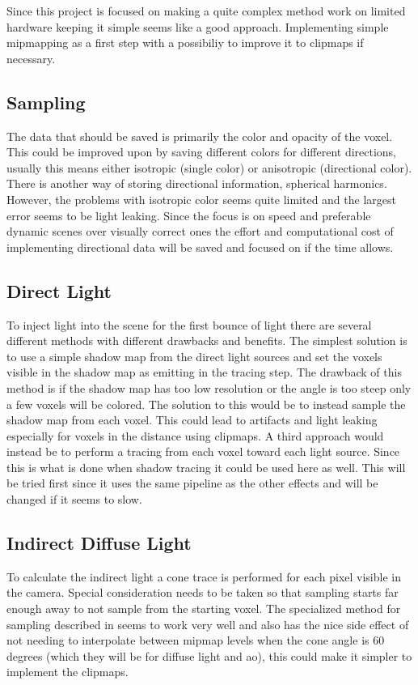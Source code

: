 \documentclass[a4paper, 12pt]{article}
\begin{document}
Since this project is focused on making a quite complex method work on limited hardware keeping it simple seems like a good approach. Implementing simple mipmapping as a first step with a possibiliy to improve it to clipmaps if necessary.

\subsection{Sampling}

The data that should be saved is primarily the color and opacity of the voxel. This could be improved upon by saving different colors for different directions, usually this means either isotropic (single color) or anisotropic (directional color). There is another way of storing directional information, spherical harmonics. However, the problems with isotropic color seems quite limited and the largest error seems to be light leaking. Since the focus is on speed and preferable dynamic scenes over visually correct ones the effort and computational cost of implementing directional data will be saved and focused on if the time allows.

\subsection{Direct Light}

To inject light into the scene for the first bounce of light there are several different methods with different drawbacks and benefits. The simplest solution is to use a simple shadow map from the direct light sources and set the voxels visible in the shadow map as emitting in the tracing step. The drawback of this method is if the shadow map has too low resolution or the angle is too steep only a few voxels will be colored. The solution to this would be to instead sample the shadow map from each voxel. This could lead to artifacts and light leaking especially for voxels in the distance using clipmaps. A third approach would instead be to perform a tracing from each voxel toward each light source. Since this is what is done when shadow tracing it could be used here as well. This will be tried first since it uses the same pipeline as the other effects and will be changed if it seems to slow.

\subsection{Indirect Diffuse Light}

To calculate the indirect light a cone trace is performed for each pixel visible in the camera. Special consideration needs to be taken so that sampling starts far enough away to not sample from the starting voxel. The specialized method for sampling described in \cite{phdthesis} seems to work very well and also has the nice side effect of not needing to interpolate between mipmap levels when the cone angle is 60 degrees (which they will be for diffuse light and \gls{ao}), this could make it simpler to implement the clipmaps.
\end{document}
